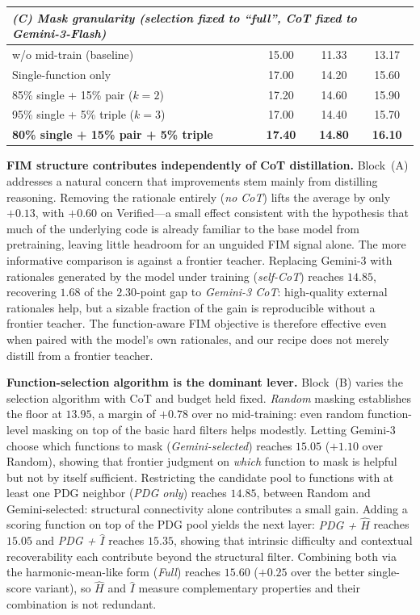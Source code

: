 \begin{table}[t]
\begin{tabular}{lccc}
\midrule
\multicolumn{4}{l}{\emph{(C) Mask granularity (selection fixed to ``full'', CoT fixed to Gemini-3-Flash)}} \\
\midrule
w/o mid-train (baseline)             & 15.00 & 11.33 & 13.17 \\
Single-function only                 & 17.00 & 14.20 & 15.60 \\
85\% single + 15\% pair ($k=2$)       & 17.20 & 14.60 & 15.90 \\
95\% single + 5\% triple ($k=3$)      & 17.00 & 14.40 & 15.70 \\
\textbf{80\% single + 15\% pair + 5\% triple} & \textbf{17.40} & \textbf{14.80} & \textbf{16.10} \\
\bottomrule
\end{tabular}
\end{table}

\textbf{FIM structure contributes independently of CoT distillation.}
Block~(A) addresses a natural concern that improvements stem mainly
from distilling reasoning. Removing the rationale entirely (\emph{no
CoT}) lifts the average by only $+0.13$, with $+0.60$ on Verified---a
small effect consistent with the hypothesis that much of the underlying
code is already familiar to the base model from pretraining, leaving
little headroom for an unguided FIM signal alone. The more
informative comparison is against a frontier teacher.
Replacing Gemini-3 with rationales
generated by the model under training (\emph{self-CoT}) reaches
$14.85$, recovering $1.68$ of the $2.30$-point gap to \emph{Gemini-3
CoT}: high-quality external rationales help, but a sizable fraction of
the gain is reproducible without a frontier teacher. The function-aware
FIM objective is therefore effective even when paired with the model's
own rationales, and our recipe does not merely distill from a frontier
teacher.

\textbf{Function-selection algorithm is the dominant lever.}
Block~(B) varies the selection algorithm with CoT and budget held
fixed. \emph{Random} masking establishes the floor at $13.95$, a margin
of $+0.78$ over no mid-training: even random function-level masking on
top of the basic hard filters helps modestly. Letting Gemini-3 choose
which functions to mask (\emph{Gemini-selected}) reaches $15.05$
($+1.10$ over Random), showing that frontier judgment on \emph{which}
function to mask is helpful but not by itself sufficient. Restricting
the candidate pool to functions with at least one PDG neighbor
(\emph{PDG only}) reaches $14.85$, between Random and Gemini-selected:
structural connectivity alone contributes a small gain. Adding a
scoring function on top of the PDG pool yields the next layer:
\emph{PDG + $\hat{H}$} reaches $15.05$ and \emph{PDG + $\hat{I}$}
reaches $15.35$, showing that intrinsic difficulty and contextual
recoverability each contribute beyond the structural filter. Combining
both via the harmonic-mean-like form (\emph{Full}) reaches $15.60$
($+0.25$ over the better single-score variant), so $\hat{H}$ and
$\hat{I}$ measure complementary properties and their combination is not
redundant.

